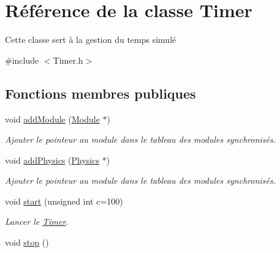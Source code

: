\hypertarget{classTimer}{\section{Référence de la classe Timer}
\label{classTimer}
}


Cette classe sert à la gestion du temps simulé  




{\ttfamily \#include $<$Timer.\-h$>$}

\subsection*{Fonctions membres publiques}
\begin{DoxyCompactItemize}
\item 
\hypertarget{classTimer_a0472ea751f9f13fd7710cce4507bb656}{void \hyperlink{classTimer_a0472ea751f9f13fd7710cce4507bb656}{add\-Module} (\hyperlink{classModule}{Module} $\ast$)}\label{classTimer_a0472ea751f9f13fd7710cce4507bb656}

\begin{DoxyCompactList}\small\item\em Ajouter le pointeur au module dans le tableau des modules synchronisés. \end{DoxyCompactList}\item 
\hypertarget{classTimer_a934b445426cea31aa5454d82e280bce5}{void \hyperlink{classTimer_a934b445426cea31aa5454d82e280bce5}{add\-Physics} (\hyperlink{classPhysics}{Physics} $\ast$)}\label{classTimer_a934b445426cea31aa5454d82e280bce5}

\begin{DoxyCompactList}\small\item\em Ajouter le pointeur au module dans le tableau des modules synchronisés. \end{DoxyCompactList}\item 
\hypertarget{classTimer_a62869fa83e1b76a9ebfe9cca7e56733d}{void \hyperlink{classTimer_a62869fa83e1b76a9ebfe9cca7e56733d}{start} (unsigned int c=100)}\label{classTimer_a62869fa83e1b76a9ebfe9cca7e56733d}

\begin{DoxyCompactList}\small\item\em Lancer le \hyperlink{classTimer}{Timer}. \end{DoxyCompactList}\item 
\hypertarget{classTimer_a63f0eb44b27402196590a03781515dba}{void \hyperlink{classTimer_a63f0eb44b27402196590a03781515dba}{stop} ()}\label{classTimer_a63f0eb44b27402196590a03781515dba}


\end{DoxyCompactItemize}

